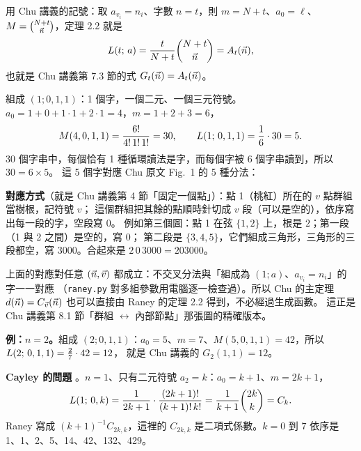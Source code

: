 用 Chu 講義的記號：取 $a_{v_i}=n_i$、字數 $n=t$，則 $m=N+t$、$a_0=\ell$、$M=\binom{N+t}{\vec n}$，定理 2.2 就是
\[
L(t;\,a)=\frac{t}{N+t}\binom{N+t}{\vec n}=A_t(\vec n),
\]
也就是 Chu 講義第 7.3 節的式 $G_t(\vec n)=A_t(\vec n)$。

\begin{exbox}
組成 $(1;0,1,1)$：1 個字，一個二元、一個三元符號。$a_0=1+0+1\cdot1+2\cdot1=4$，$m=1+2+3=6$，
\[
M(4,0,1,1)=\frac{6!}{4!\,1!\,1!}=30,\qquad L(1;\,0,1,1)=\frac{1}{6}\cdot30=5 .
\]
30 個字串中，每個恰有 1 種循環讀法是字，而每個字被 6 個字串讀到，所以 $30=6\times5$。
這 5 個字對應 Chu 原文 Fig.~1 的 5 種分法：
\begin{center}
\RanChuFigOne
\end{center}
\textbf{對應方式}\extra（就是 Chu 講義第 4 節「固定一個點」）：點 1（桃紅）所在的 $v$ 點群組當樹根，記符號 $v$；
這個群組把其餘的點順時針切成 $v$ 段（可以是空的），依序寫出每一段的字，空段寫 0。
例如第三個圖：點 1 在弦 $\{1,2\}$ 上，根是 $2$；第一段（1 與 2 之間）是空的，寫 $0$；
第二段是 $\{3,4,5\}$，它們組成三角形，三角形的三段都空，寫 $3000$。合起來是 $2\,0\,3000=203000$。
\end{exbox}

\begin{notebox}
上面的對應對任意 $(\vec n,\vec v)$ 都成立：不交叉分法與「組成為 $(1;a)$、$a_{v_i}=n_i$」的字一一對應
（\texttt{raney.py} 對多組參數用電腦逐一檢查過）。所以 Chu 的主定理
$d(\vec n)=C_{\vec v}(\vec n)$ 也可以直接由 Raney 的定理 2.2 得到，不必經過生成函數。
這正是 Chu 講義第 8.1 節「群組 $\leftrightarrow$ 內部節點」那張圖的精確版本。
\end{notebox}

\textbf{例：$n=2$。}組成 $(2;0,1,1)$：$a_0=5$、$m=7$、$M(5,0,1,1)=42$，所以 $L(2;\,0,1,1)=\frac27\cdot42=12$，
就是 Chu 講義的 $G_2(1,1)=12$。

\textbf{Cayley 的問題} 。$n=1$、只有二元符號 $a_2=k$：$a_0=k+1$、$m=2k+1$，
\[
L(1;\,0,k)=\frac{1}{2k+1}\cdot\frac{(2k+1)!}{(k+1)!\,k!}=\frac{1}{k+1}\binom{2k}{k}=C_k .
\]
Raney 寫成 $(k+1)^{-1}C_{2k,k}$，這裡的 $C_{2k,k}$ 是二項式係數。$k=0$ 到 $7$ 依序是 1、1、2、5、14、42、132、429。

\begin{table}[H]
\centering
\small
\RanLTable
\caption{定理 2.2 的例子。「$\frac nmM$」是公式，「暴力」是把所有字串列出來、用判別法篩選後數出來的個數。
後兩欄是 Chu 講義的說法（$\vn$ 只列出用到的群組）。}
\label{tab:L}
\end{table}


